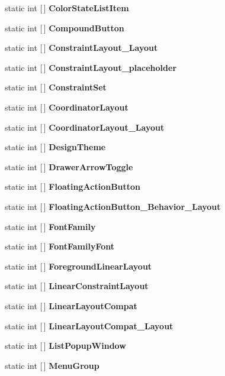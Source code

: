 \begin{DoxyCompactItemize}
\item 
static int \mbox{[}$\,$\mbox{]} {\bfseries Color\+State\+List\+Item}
\item 
static int \mbox{[}$\,$\mbox{]} {\bfseries Compound\+Button}
\item 
\mbox{\label{classst_delivery_1_1_resource_1_1_styleable_a2e27d832f509dda43ef22ea5679654d8}} 
static int \mbox{[}$\,$\mbox{]} {\bfseries Constraint\+Layout\+\_\+\+Layout}
\item 
static int \mbox{[}$\,$\mbox{]} {\bfseries Constraint\+Layout\+\_\+placeholder}
\item 
\mbox{\label{classst_delivery_1_1_resource_1_1_styleable_a02a3abd1e377a51828fbaa125ea22df5}} 
static int \mbox{[}$\,$\mbox{]} {\bfseries Constraint\+Set}
\item 
static int \mbox{[}$\,$\mbox{]} {\bfseries Coordinator\+Layout}
\item 
static int \mbox{[}$\,$\mbox{]} {\bfseries Coordinator\+Layout\+\_\+\+Layout}
\item 
static int \mbox{[}$\,$\mbox{]} {\bfseries Design\+Theme}
\item 
static int \mbox{[}$\,$\mbox{]} {\bfseries Drawer\+Arrow\+Toggle}
\item 
static int \mbox{[}$\,$\mbox{]} {\bfseries Floating\+Action\+Button}
\item 
static int \mbox{[}$\,$\mbox{]} {\bfseries Floating\+Action\+Button\+\_\+\+Behavior\+\_\+\+Layout}
\item 
static int \mbox{[}$\,$\mbox{]} {\bfseries Font\+Family}
\item 
static int \mbox{[}$\,$\mbox{]} {\bfseries Font\+Family\+Font}
\item 
static int \mbox{[}$\,$\mbox{]} {\bfseries Foreground\+Linear\+Layout}
\item 
static int \mbox{[}$\,$\mbox{]} {\bfseries Linear\+Constraint\+Layout}
\item 
static int \mbox{[}$\,$\mbox{]} {\bfseries Linear\+Layout\+Compat}
\item 
static int \mbox{[}$\,$\mbox{]} {\bfseries Linear\+Layout\+Compat\+\_\+\+Layout}
\item 
static int \mbox{[}$\,$\mbox{]} {\bfseries List\+Popup\+Window}
\item 
static int \mbox{[}$\,$\mbox{]} {\bfseries Menu\+Group}
\item 

\end{DoxyCompactItemize}
